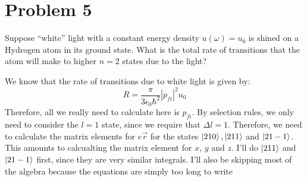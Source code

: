\documentclass[10pt]{article}
\begin{document}
	\pagebreak
	\section*{Problem 5}
	Suppose ``white'' light with a constant energy density $u(\omega) = u_0$ is shined on a Hydrogen atom 
	in its ground state. What is the total rate of transitions that the atom will make to higher $n=2$ states
	due to the light?

	\begin{solution}
		We know that the rate of transitions due to white light is given by: 
		\[ R = \frac{\pi}{3 \epsilon_0 \hbar^2} |p_{fi}|^2 u_0\]
		Therefore, all we really need to calculate here is $p_{fi}$. By selection rules, we only need to consider the $l = 1$ state, since we require that $\Delta l = 1$. Therefore, we need to calculate the matrix elements for $e \vec r$ for the states $\ket{210}, \ket{211}$ and $\ket{21-1}$. This amounts to calcualting the matrix element for $x$, $y$ and $z$. I'll do $\ket{211}$ and $\ket{21-1}$ first, since they are very similar integrals. I'll also be skipping most of the algebra because the equations are simply too long to write


\end{solution}
\end{document}
